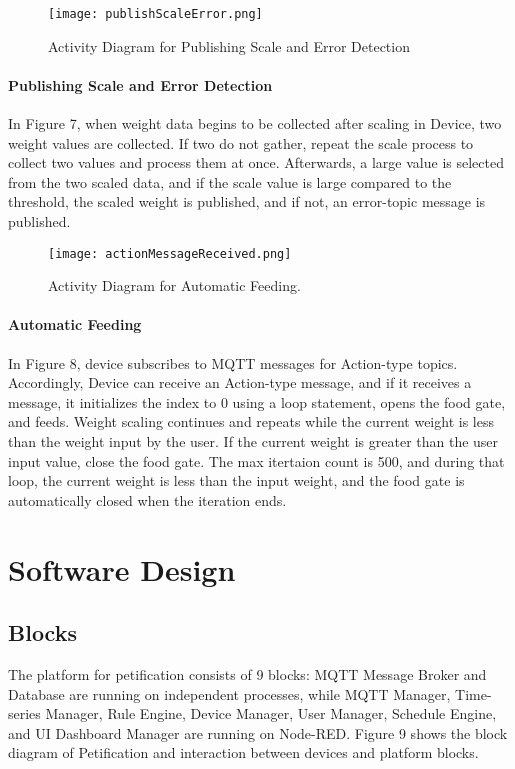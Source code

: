 \documentclass[conference]{IEEEtran}
\begin{document}
\begin{figure}[htbp]
\centerline{\texttt{[image: publishScaleError.png]}}
\caption{Activity Diagram for Publishing Scale and Error Detection}
\label{fig}
\end{figure}

\paragraph{Publishing Scale and Error Detection}
In Figure 7, when weight data begins to be collected after scaling in Device, two weight values are collected. If two do not gather, repeat the scale process to collect two values and process them at once. Afterwards, a large value is selected from the two scaled data, and if the scale value is large compared to the threshold, the scaled weight is published, and if not, an error-topic message is published.

\begin{figure}[htbp!]
\centerline{\texttt{[image: actionMessageReceived.png]}}
\caption{Activity Diagram for Automatic Feeding.}
\label{fig} 
\end{figure}

\paragraph{Automatic Feeding}
In Figure 8, device subscribes to MQTT messages for Action-type topics.
Accordingly, Device can receive an Action-type message, and if it receives a message, it initializes the index to 0 using a loop statement, opens the food gate, and feeds.
Weight scaling continues and repeats while the current weight is less than the weight input by the user.
If the current weight is greater than the user input value, close the food gate.
The max itertaion count is 500, and during that loop, the current weight is less than the input weight, and the food gate is automatically closed when the iteration ends.

\section{Software Design}
\subsection{Blocks}
The platform for petification consists of 9 blocks: MQTT Message Broker and Database are running on independent processes, while MQTT Manager, Time-series Manager, Rule Engine, Device Manager, User Manager, Schedule Engine, and UI Dashboard Manager are running on Node-RED. Figure 9
shows the block diagram of Petification and interaction between devices and platform blocks.
\end{document}
